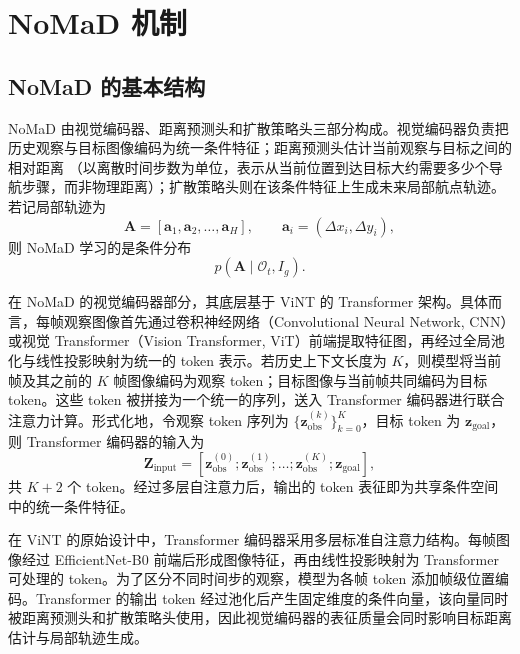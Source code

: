 \section{NoMaD 机制}

\subsection{NoMaD 的基本结构}

NoMaD 由视觉编码器、距离预测头和扩散策略头三部分构成\cite{nomad2023}。视觉编码器负责把历史观察与目标图像编码为统一条件特征；距离预测头估计当前观察与目标之间的相对距离
（以离散时间步数为单位，表示从当前位置到达目标大约需要多少个导航步骤，而非物理距离）；扩散策略头则在该条件特征上生成未来局部航点轨迹。若记局部轨迹为
\begin{equation}
\mathbf{A} = [\mathbf{a}_1,\mathbf{a}_2,\ldots,\mathbf{a}_H], \qquad \mathbf{a}_i=(\Delta x_i,\Delta y_i),
\end{equation}
则 NoMaD 学习的是条件分布
\begin{equation}
p(\mathbf{A}\mid \mathcal{O}_t, I_g).
\end{equation}

在 NoMaD 的视觉编码器部分，其底层基于 ViNT 的 Transformer 架构。具体而言，每帧观察图像首先通过卷积神经网络（Convolutional Neural Network, CNN）或视觉 Transformer（Vision Transformer, ViT）前端提取特征图，再经过全局池化与线性投影映射为统一的 token 表示。若历史上下文长度为 $K$，则模型将当前帧及其之前的 $K$ 帧图像编码为观察 token；目标图像与当前帧共同编码为目标 token。这些 token 被拼接为一个统一的序列，送入 Transformer 编码器进行联合注意力计算。形式化地，令观察 token 序列为 $\{\mathbf{z}_{\text{obs}}^{(k)}\}_{k=0}^{K}$，目标 token 为 $\mathbf{z}_{\text{goal}}$，则 Transformer 编码器的输入为
\begin{equation}
\mathbf{Z}_{\text{input}} = [\mathbf{z}_{\text{obs}}^{(0)}; \mathbf{z}_{\text{obs}}^{(1)}; \ldots; \mathbf{z}_{\text{obs}}^{(K)}; \mathbf{z}_{\text{goal}}],
\end{equation}
共 $K+2$ 个 token。经过多层自注意力后，输出的 token 表征即为共享条件空间中的统一条件特征。

在 ViNT\cite{vint2023} 的原始设计中，Transformer\cite{transformer2017} 编码器采用多层标准自注意力结构。每帧图像经过 EfficientNet-B0\cite{efficientnet2019} 前端后形成图像特征，再由线性投影映射为 Transformer 可处理的 token。为了区分不同时间步的观察，模型为各帧 token 添加帧级位置编码。Transformer 的输出 token 经过池化后产生固定维度的条件向量，该向量同时被距离预测头和扩散策略头使用，因此视觉编码器的表征质量会同时影响目标距离估计与局部轨迹生成。

